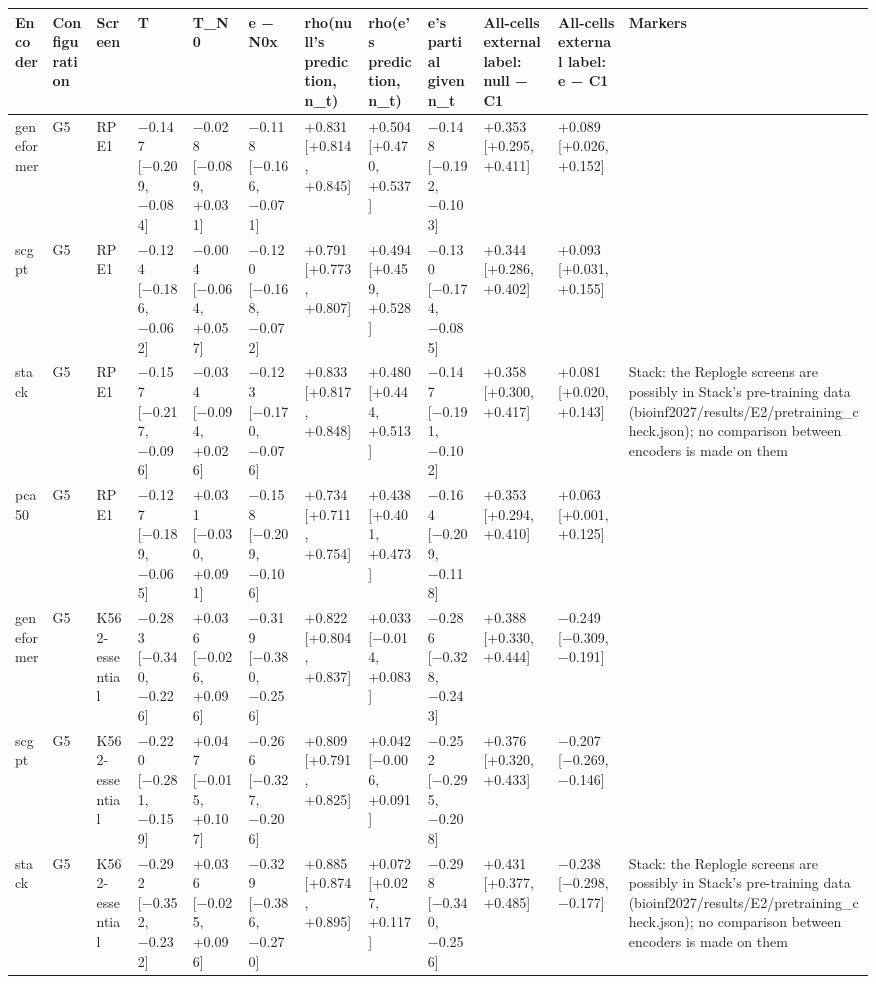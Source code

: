\begin{tabular}{llllllllllll}
\toprule
Encoder & Configuration & Screen & T & T\_N0 & e − N0x & rho(null's prediction, n\_t) & rho(e's prediction, n\_t) & e's partial given n\_t & All-cells external label: null − C1 & All-cells external label: e − C1 & Markers \\
\midrule
geneformer & G5 & RPE1 & −0.147 [−0.209, −0.084] & −0.028 [−0.089, +0.031] & −0.118 [−0.166, −0.071] & +0.831 [+0.814, +0.845] & +0.504 [+0.470, +0.537] & −0.148 [−0.192, −0.103] & +0.353 [+0.295, +0.411] & +0.089 [+0.026, +0.152] &  \\
scgpt & G5 & RPE1 & −0.124 [−0.186, −0.062] & −0.004 [−0.064, +0.057] & −0.120 [−0.168, −0.072] & +0.791 [+0.773, +0.807] & +0.494 [+0.459, +0.528] & −0.130 [−0.174, −0.085] & +0.344 [+0.286, +0.402] & +0.093 [+0.031, +0.155] &  \\
stack & G5 & RPE1 & −0.157 [−0.217, −0.096] & −0.034 [−0.094, +0.026] & −0.123 [−0.170, −0.076] & +0.833 [+0.817, +0.848] & +0.480 [+0.444, +0.513] & −0.147 [−0.191, −0.102] & +0.358 [+0.300, +0.417] & +0.081 [+0.020, +0.143] & Stack: the Replogle screens are possibly in Stack's pre-training data (bioinf2027/results/E2/pretraining\_check.json); no comparison between encoders is made on them \\
pca50 & G5 & RPE1 & −0.127 [−0.189, −0.065] & +0.031 [−0.030, +0.091] & −0.158 [−0.209, −0.106] & +0.734 [+0.711, +0.754] & +0.438 [+0.401, +0.473] & −0.164 [−0.209, −0.118] & +0.353 [+0.294, +0.410] & +0.063 [+0.001, +0.125] &  \\
geneformer & G5 & K562-essential & −0.283 [−0.340, −0.226] & +0.036 [−0.026, +0.096] & −0.319 [−0.380, −0.256] & +0.822 [+0.804, +0.837] & +0.033 [−0.014, +0.083] & −0.286 [−0.328, −0.243] & +0.388 [+0.330, +0.444] & −0.249 [−0.309, −0.191] &  \\
scgpt & G5 & K562-essential & −0.220 [−0.281, −0.159] & +0.047 [−0.015, +0.107] & −0.266 [−0.327, −0.206] & +0.809 [+0.791, +0.825] & +0.042 [−0.006, +0.091] & −0.252 [−0.295, −0.208] & +0.376 [+0.320, +0.433] & −0.207 [−0.269, −0.146] &  \\
stack & G5 & K562-essential & −0.292 [−0.352, −0.232] & +0.036 [−0.025, +0.096] & −0.329 [−0.386, −0.270] & +0.885 [+0.874, +0.895] & +0.072 [+0.027, +0.117] & −0.298 [−0.340, −0.256] & +0.431 [+0.377, +0.485] & −0.238 [−0.298, −0.177] & Stack: the Replogle screens are possibly in Stack's pre-training data (bioinf2027/results/E2/pretraining\_check.json); no comparison between encoders is made on them \\

\end{tabular}
